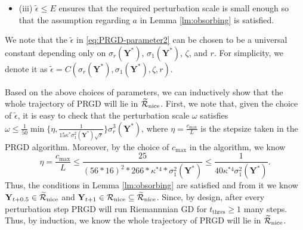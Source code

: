 \documentclass[11pt]{article}
\newcommand{\0}{{\mathbf{0}}}
\newcommand{\1}{{\mathbf{1}}}
\newcommand{\Y}{{\mathbf{Y}}}
\newcommand{\cR}{{\cal R}}
\begin{document}
{\begin{itemize}
	\item (iii) $\tilde{\epsilon} \leq  E$ ensures that the required perturbation scale is small enough so that the assumption regarding $a$ in Lemma \ref{lm:obsorbing} is satisfied. 
\end{itemize}
We note that the $\tilde{\epsilon}$ in \eqref{eq:PRGD-parameter2} can be chosen to be a universal constant depending only on $\sigma_r(\Y^*)$, $\sigma_1(\Y^*)$, $\zeta$, and $r$. For simplicity, we denote it as $\tilde{\epsilon} = C(\sigma_r(\Y^*), \sigma_1(\Y^*), \zeta, r)$.


Based on the above choices of parameters, we can inductively show that the whole trajectory of PRGD will lie in $\widetilde{\cR}_{\text{nice}}$. First, we note that, given the choice of $\tilde{\epsilon}$, it is easy to check that the perturbation scale $\omega$ satisfies $\omega \leq  \frac{1}{50} \min \{ \eta, \frac{1}{15 \kappa^* \sigma^2_1(\Y^*) \sqrt{r} }\} \sigma_r^3(\Y^*)$, where $\eta = \frac{c_{\max}}{L}$ is the stepsize taken in the PRGD algorithm. Moreover, by the choice of $c_{\max}$ in the algorithm, we know
\begin{equation*}
	\eta = \frac{c_{\max}}{L} \leq \frac{25}{(56*16)^2 * 266* \kappa^{*4} * \sigma^2_1(\Y^*)} \leq  \frac{1}{40 \kappa^{*4} \sigma^2_1(\Y^*) }.
\end{equation*} Thus, the conditions in Lemma \ref{lm:obsorbing} are satisfied and from it we know $\Y_{t+0.5} \in \widetilde{\cR}_{\text{nice}}$ and ${\Y}_{t+1} \in \cR_{\text{nice}}\subseteq \widetilde{\cR}_{\text{nice}}$. Since, by design, after every perturbation step PRGD will run Riemannnian GD for $t_{\text{thres}} \geq 1$ many steps. Thus, by induction, we know the whole trajectory of PRGD will lie in $ \widetilde{\cR}_{\text{nice}}$. 


}
\end{document}
